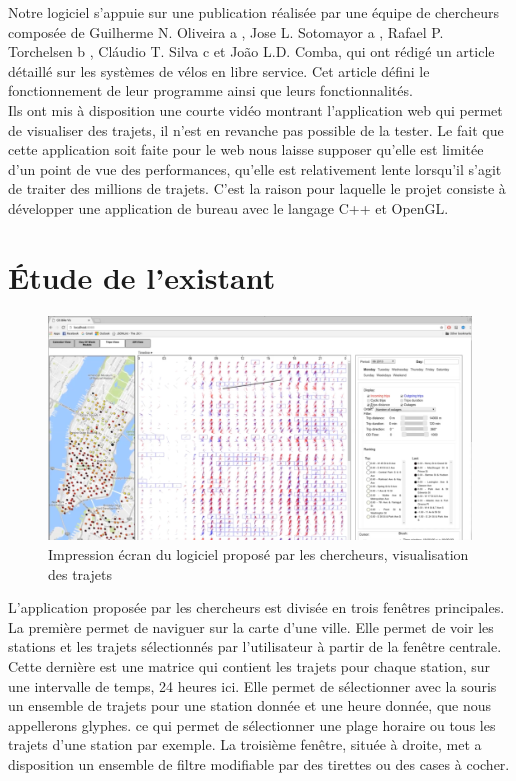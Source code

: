 \documentclass[12pt]{article}
\begin{document}
	Notre logiciel s'appuie sur une publication réalisée par une équipe de chercheurs composée
	de Guilherme N. Oliveira a , Jose L. Sotomayor a , Rafael P. Torchelsen b , Cláudio T. Silva c
	et 
	João L.D. Comba, qui ont rédigé un article \cite{Oli16} détaillé sur les systèmes de vélos en
	libre service. Cet article défini le fonctionnement de leur programme ainsi que leurs
	fonctionnalités. \\
	
	Ils ont mis à disposition une courte vidéo montrant l'application web qui permet 
	de visualiser des trajets, il n'est en revanche pas possible de la tester. Le fait
	que cette application
	soit faite pour le web nous laisse	supposer qu’elle est limitée d'un
	point de vue des performances, qu’elle est relativement lente lorsqu’il s’agit
	de traiter des millions de trajets. C’est la raison pour laquelle 
	le projet consiste à développer une application de bureau avec le langage C++ et OpenGL.
	
\newpage
	\section{Étude de l’existant}	\label{etude_de_lexistant}
	\begin{figure}[!h]
	\begin{center}
	\includegraphics[scale=.3]{existant_trips.png}
	\caption{Impression écran du logiciel proposé par les chercheurs, visualisation des trajets}
	\label{fig:trips_screen}
	\end{center}
	\end{figure}	
	
	L’application proposée par les chercheurs est divisée en trois fenêtres principales.
	La première permet de naviguer sur la carte d’une ville. Elle permet de voir les
	stations et les trajets sélectionnés par l’utilisateur à partir de la fenêtre centrale.
	Cette dernière est une matrice qui contient les trajets pour chaque station, sur une
	intervalle de temps, 24 heures ici. Elle permet de sélectionner avec la souris un
	ensemble de trajets pour une station donnée et une heure donnée, que nous appellerons glyphes.
	ce qui permet de sélectionner une plage horaire ou tous les trajets d'une station par exemple.
	La troisième fenêtre, située à droite, met a disposition un ensemble de filtre modifiable
	par des tirettes ou des cases à cocher. \\
	
\end{document}
